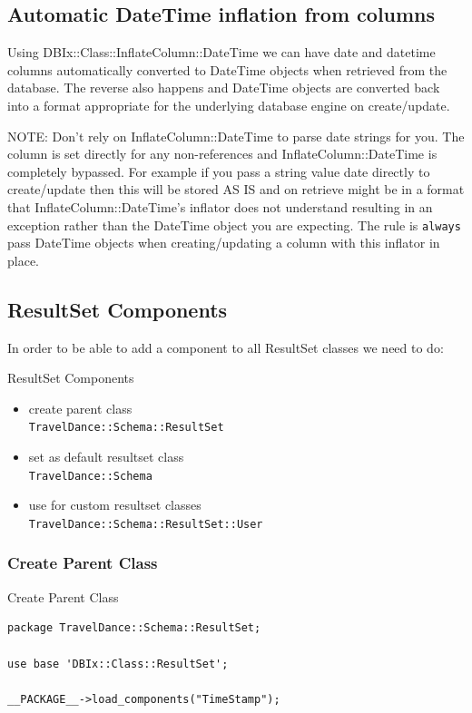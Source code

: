 \subsection{Automatic DateTime inflation from columns}

Using DBIx::Class::InflateColumn::DateTime we can have date and datetime
columns automatically converted to DateTime objects when retrieved from the
database. The reverse also happens and DateTime objects are converted back
into a format appropriate for the underlying database engine on
create/update.

NOTE: Don't rely on InflateColumn::DateTime to parse date strings for
you. The column is set directly for any non-references and
InflateColumn::DateTime is completely bypassed. For example if you pass a
string value date directly to create/update then this will be stored AS IS
and on retrieve might be in a format that InflateColumn::DateTime’s inflator
does not understand resulting in an exception rather than the DateTime
object you are expecting. The rule is \verb|always| pass DateTime objects when
creating/updating a column with this inflator in place.

\subsection{ResultSet Components}

In order to be able to add a component to all ResultSet classes we need to
do:

\begin{frame}[fragile]{ResultSet Components}
\begin{itemize}
\item create parent class \\
  \verb|TravelDance::Schema::ResultSet|
\item set as default resultset class \\
  \verb|TravelDance::Schema|
\item use for custom resultset classes \\
 \verb|TravelDance::Schema::ResultSet::User|
\end{itemize}
\end{frame}

\subsubsection{Create Parent Class}

\begin{frame}[fragile]{Create Parent Class}
\begin{lstlisting}
package TravelDance::Schema::ResultSet;

use base 'DBIx::Class::ResultSet';

__PACKAGE__->load_components("TimeStamp");
\end{lstlisting}
\end{frame}

